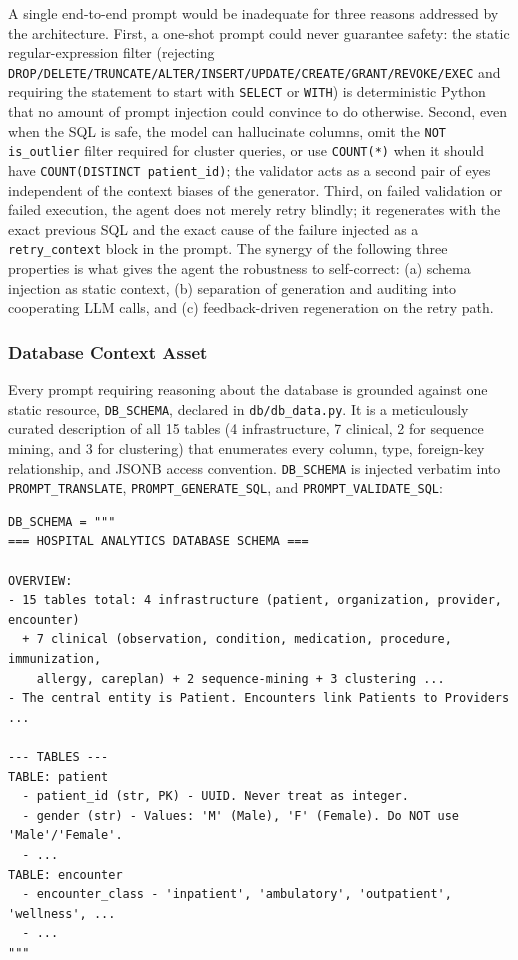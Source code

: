 A single end-to-end prompt would be inadequate for three reasons addressed by the architecture. First, a one-shot prompt could never guarantee safety: the static regular-expression filter (rejecting \texttt{DROP/DELETE/TRUNCATE/ALTER/INSERT/UPDATE/CREATE/GRANT/REVOKE/EXEC} and requiring the statement to start with \texttt{SELECT} or \texttt{WITH}) is deterministic Python that no amount of prompt injection could convince to do otherwise. Second, even when the SQL is safe, the model can hallucinate columns, omit the \texttt{NOT is\_outlier} filter required for cluster queries, or use \texttt{COUNT(*)} when it should have \texttt{COUNT(DISTINCT patient\_id)}; the validator acts as a second pair of eyes independent of the context biases of the generator. Third, on failed validation or failed execution, the agent does not merely retry blindly; it regenerates with the exact previous SQL and the exact cause of the failure injected as a \texttt{retry\_context} block in the prompt. The synergy of the following three properties is what gives the agent the robustness to self-correct: (a) schema injection as static context, (b) separation of generation and auditing into cooperating LLM calls, and (c) feedback-driven regeneration on the retry path.

\subsubsection*{Database Context Asset}

Every prompt requiring reasoning about the database is grounded against one static resource, \texttt{DB\_\allowbreak SCHEMA}, declared in \texttt{db/db\_data.py}. It is a meticulously curated description of all 15 tables (4 infrastructure, 7 clinical, 2 for sequence mining, and 3 for clustering) that enumerates every column, type, foreign-key relationship, and JSONB access convention. \texttt{DB\_\allowbreak SCHEMA} is injected verbatim into \texttt{PROMPT\_\allowbreak TRANSLATE}, \texttt{PROMPT\_\allowbreak GENERATE\_\allowbreak SQL}, and \texttt{PROMPT\_\allowbreak VALIDATE\_\allowbreak SQL}:

\begin{lstlisting}[style=pythonstyle]
DB_SCHEMA = """
=== HOSPITAL ANALYTICS DATABASE SCHEMA ===

OVERVIEW:
- 15 tables total: 4 infrastructure (patient, organization, provider, encounter)
  + 7 clinical (observation, condition, medication, procedure, immunization,
    allergy, careplan) + 2 sequence-mining + 3 clustering ...
- The central entity is Patient. Encounters link Patients to Providers ...

--- TABLES ---
TABLE: patient
  - patient_id (str, PK) - UUID. Never treat as integer.
  - gender (str) - Values: 'M' (Male), 'F' (Female). Do NOT use 'Male'/'Female'.
  - ...
TABLE: encounter
  - encounter_class - 'inpatient', 'ambulatory', 'outpatient', 'wellness', ...
  - ...
"""
\end{lstlisting}

